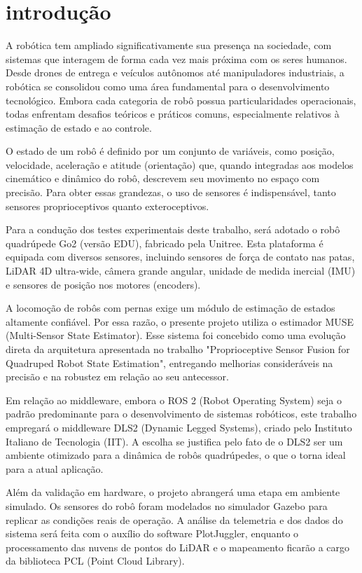 \chapter{introdução}

A robótica tem ampliado significativamente sua presença na sociedade, 
com sistemas que interagem de forma cada vez mais próxima com os seres humanos. 
Desde drones de entrega e veículos autônomos até manipuladores industriais, a 
robótica se consolidou como uma área fundamental para o desenvolvimento 
tecnológico. Embora cada categoria de robô possua particularidades operacionais, 
todas enfrentam desafios teóricos e práticos comuns, especialmente relativos à 
estimação de estado e ao controle.

O estado de um robô é definido por um conjunto de variáveis, como posição, 
velocidade, aceleração e atitude (orientação) que, quando integradas aos 
modelos cinemático e dinâmico do robô, descrevem seu movimento no espaço com 
precisão. Para obter essas grandezas, o uso de sensores é indispensável, tanto 
sensores proprioceptivos quanto exteroceptivos.

Para a condução dos testes experimentais deste trabalho, será adotado o robô 
quadrúpede Go2 (versão EDU), fabricado pela Unitree. Esta plataforma é equipada 
com diversos sensores, incluindo sensores de força de contato nas patas, LiDAR 4D 
ultra-wide, câmera grande angular, unidade de medida inercial (IMU) e sensores de 
posição nos motores (encoders).

A locomoção de robôs com pernas exige um módulo de estimação de estados altamente 
confiável. Por essa razão, o presente projeto utiliza o estimador MUSE 
(Multi-Sensor State Estimator). Esse sistema foi concebido como uma evolução 
direta da arquitetura apresentada no trabalho "Proprioceptive Sensor Fusion for 
Quadruped Robot State Estimation", entregando melhorias consideráveis na precisão 
e na robustez em relação ao seu antecessor.

Em relação ao middleware, embora o ROS 2 (Robot Operating System) seja o padrão 
predominante para o desenvolvimento de sistemas robóticos, este trabalho empregará
 o middleware DLS2 (Dynamic Legged Systems), criado pelo Instituto Italiano de 
 Tecnologia (IIT). A escolha se justifica pelo fato de o DLS2 ser um ambiente 
 otimizado para a dinâmica de robôs quadrúpedes, o que o torna ideal para a atual 
 aplicação.

 Além da validação em hardware, o projeto abrangerá uma etapa em ambiente 
 simulado. Os sensores do robô foram modelados no simulador Gazebo para replicar 
 as condições reais de operação. A análise da telemetria e dos dados do sistema 
 será feita com o auxílio do software PlotJuggler, enquanto o processamento das 
 nuvens de pontos do LiDAR e o mapeamento ficarão a cargo da biblioteca PCL 
 (Point Cloud Library).